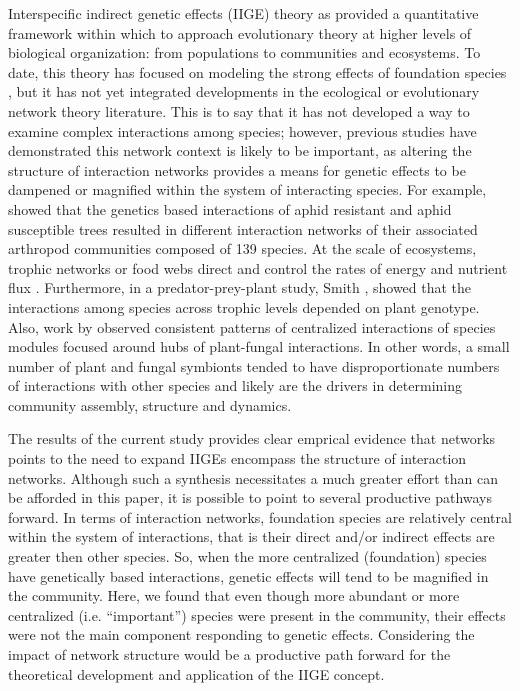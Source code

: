 \documentclass[11pt,twocolumn,twoside,lineno]{pnas-new}
\begin{document}
Interspecific indirect genetic effects (IIGE) theory as provided a
quantitative framework within which to approach evolutionary theory at
higher levels of biological organization: from populations to
communities and ecosystems. To date, this theory has focused on
modeling the strong effects of foundation species
\cite{Shuster2006COMMUNITYSTRUCTURE, Whitham2012}, but it has not yet
integrated developments in the ecological or evolutionary network
theory literature. This is to say that it has not developed a way to
examine complex interactions among species; however, previous studies
have demonstrated this network context is likely to be important, as
altering the structure of interaction networks provides a means for
genetic effects to be dampened or magnified within the system of
interacting species. For example, \citep{Keith2017} showed that the
genetics based interactions of aphid resistant and aphid susceptible
trees resulted in different interaction networks of their associated
arthropod communities composed of 139 species. At the scale of
ecosystems, trophic networks or food webs direct and control the rates
of energy and nutrient flux \cite{Borgatti2006}. Furthermore, in a
predator-prey-plant study, Smith \cite{Smith2011}, showed that the
interactions among species across trophic levels depended on plant
genotype. Also, work by \citep{Toju2017, Toju2016, Toju2014a} observed
consistent patterns of centralized interactions of species modules
focused around hubs of plant-fungal interactions. In other words, a
small number of plant and fungal symbionts tended to have
disproportionate numbers of interactions with other species and likely
are the drivers in determining community assembly, structure and
dynamics.

The results of the current study provides clear emprical evidence that
networks points to the need to expand IIGEs encompass the structure of
interaction networks. Although such a synthesis necessitates a much
greater effort than can be afforded in this paper, it is possible to
point to several productive pathways forward. In terms of interaction
networks, foundation species are relatively central within the system
of interactions, that is their direct and/or indirect effects are
greater then other species. So, when the more centralized (foundation)
species have genetically based interactions, genetic effects will tend
to be magnified in the community. Here, we found that even though more
abundant or more centralized (i.e. ``important'') species were present
in the community, their effects were not the main component responding
to genetic effects. Considering the impact of network structure would
be a productive path forward for the theoretical development and
application of the IIGE concept.
\end{document}
